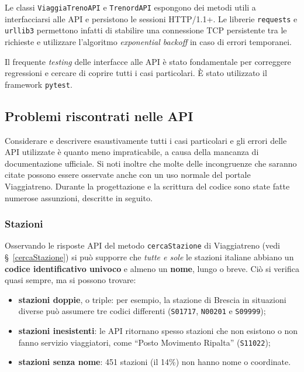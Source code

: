 \documentclass[12pt,a4paper,italian]{report}
\begin{document}
Le classi \texttt{ViaggiaTrenoAPI} e \texttt{TrenordAPI} espongono dei
metodi utili a interfacciarsi alle API e persistono le sessioni
HTTP/1.1+.  Le librerie \texttt{requests} e \texttt{urllib3}
permettono infatti di stabilire una connessione TCP persistente tra le
richieste e utilizzare l'algoritmo \textit{exponential backoff} in
caso di errori temporanei.

Il frequente \textit{testing} delle interfacce alle API è stato
fondamentale per correggere regressioni e cercare di coprire tutti i
casi particolari.  È stato utilizzato il framework \texttt{pytest}.

\subsection{Problemi riscontrati nelle API}

Considerare e descrivere esaustivamente tutti i casi particolari e gli
errori delle API utilizzate è quanto meno impraticabile, a causa della
mancanza di documentazione ufficiale.  Si noti inoltre che molte delle
incongruenze che saranno citate possono essere osservate anche con un
uso normale del portale Viaggiatreno.  Durante la progettazione e la
scrittura del codice sono state fatte numerose assunzioni, descritte
in seguito.

\subsubsection{Stazioni}

Osservando le risposte API del metodo \texttt{cercaStazione} di
Viaggiatreno (vedi \S~\ref{cercaStazione}) si può supporre che
\textit{tutte e sole} le stazioni italiane abbiano un \textbf{codice
    identificativo univoco} e almeno un \textbf{nome}, lungo o breve.
Ciò si verifica quasi sempre, ma si possono trovare:
\begin{itemize}
    \item \textbf{stazioni doppie}, o triple: per esempio, la stazione
    di Brescia in situazioni diverse può assumere tre codici
    differenti (\texttt{S01717}, \texttt{N00201} e \texttt{S09999});
    \item \textbf{stazioni inesistenti}: le API ritornano spesso
    stazioni che non esistono o non fanno servizio viaggiatori, come
    ``Posto Movimento Ripalta'' (\texttt{S11022});
    \item \textbf{stazioni senza nome}: 451 stazioni (il 14\%) non
    hanno nome o coordinate.
\end{itemize}
\end{document}
